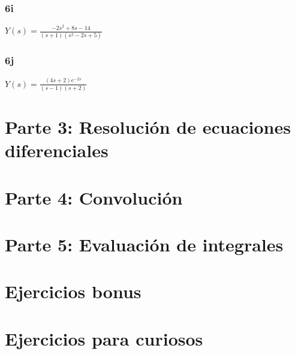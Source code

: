 \documentclass[11pt]{article}
\begin{document}
	\subsubsection{6i}
	$\displaystyle Y(s)=\frac{-2s^{2}+8s-14}{(s+1)(s^{2}-2s+5)}$
	\subsubsection{6j}
	$\displaystyle Y(s)=\frac{(4s+2)e^{-2s}}{(s-1)(s+2)}$
	
	\section{Parte 3: Resolución de ecuaciones diferenciales}
	\section{Parte 4: Convolución}
	\section{Parte 5: Evaluación de integrales}
	\section{Ejercicios bonus}
	\section{Ejercicios para curiosos}
\end{document}
